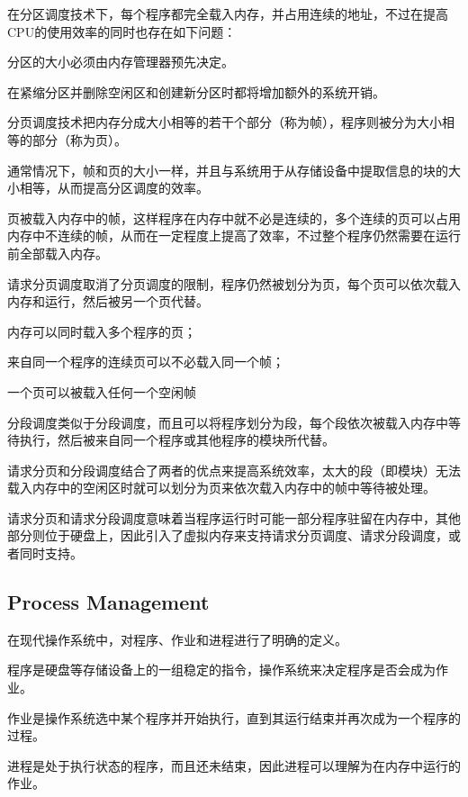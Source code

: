 在分区调度技术下，每个程序都完全载入内存，并占用连续的地址，不过在提高CPU的使用效率的同时也存在如下问题：

\begin{compactitem}
\item 分区的大小必须由内存管理器预先决定。
\item 在紧缩分区并删除空闲区和创建新分区时都将增加额外的系统开销。
\end{compactitem}

分页调度技术把内存分成大小相等的若干个部分（称为帧），程序则被分为大小相等的部分（称为页）。

通常情况下，帧和页的大小一样，并且与系统用于从存储设备中提取信息的块的大小相等，从而提高分区调度的效率。

页被载入内存中的帧，这样程序在内存中就不必是连续的，多个连续的页可以占用内存中不连续的帧，从而在一定程度上提高了效率，不过整个程序仍然需要在运行前全部载入内存。

请求分页调度取消了分页调度的限制，程序仍然被划分为页，每个页可以依次载入内存和运行，然后被另一个页代替。

\begin{compactitem}
\item 内存可以同时载入多个程序的页；
\item 来自同一个程序的连续页可以不必载入同一个帧；
\item 一个页可以被载入任何一个空闲帧
\end{compactitem}

分段调度类似于分段调度，而且可以将程序划分为段，每个段依次被载入内存中等待执行，然后被来自同一个程序或其他程序的模块所代替。

请求分页和分段调度结合了两者的优点来提高系统效率，太大的段（即模块）无法载入内存中的空闲区时就可以划分为页来依次载入内存中的帧中等待被处理。


请求分页和请求分段调度意味着当程序运行时可能一部分程序驻留在内存中，其他部分则位于硬盘上，因此引入了虚拟内存来支持请求分页调度、请求分段调度，或者同时支持。


\subsection{Process Management}

在现代操作系统中，对程序、作业和进程进行了明确的定义。

\begin{compactitem}
\item 程序是硬盘等存储设备上的一组稳定的指令，操作系统来决定程序是否会成为作业。
\item 作业是操作系统选中某个程序并开始执行，直到其运行结束并再次成为一个程序的过程。
\item 进程是处于执行状态的程序，而且还未结束，因此进程可以理解为在内存中运行的作业。
\end{compactitem}

